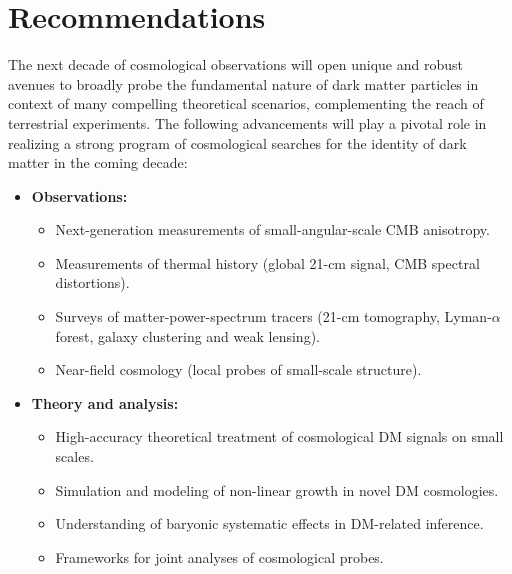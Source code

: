 \documentclass[12pt]{article}
\begin{document}
\section{Recommendations}
\label{sec:recommendations}
\vspace{-0.2cm}
The next decade of cosmological observations will open unique and robust avenues to broadly probe the fundamental nature of dark matter particles in context of many compelling theoretical scenarios, complementing the reach of terrestrial experiments.
The following advancements will play a pivotal role in realizing a strong program of cosmological searches for the identity of dark matter in the coming decade:
\vspace{-0.cm}
\begin{itemize}
    \item \textbf{Observations:}
    \begin{itemize}
        \item Next-generation measurements of small-angular-scale CMB anisotropy.
        \item Measurements of thermal history (global 21-cm signal, CMB spectral distortions).
        \item Surveys of matter-power-spectrum tracers (21-cm tomography, Lyman-$\alpha$ forest, galaxy clustering and weak lensing).
        \item Near-field cosmology (local probes of small-scale structure).
    \end{itemize}
    \vspace{-0.2cm}
    \item \textbf{Theory and analysis:}
    \begin{itemize}
        \item High-accuracy theoretical treatment of cosmological DM signals on small scales.
        \item Simulation and modeling of non-linear growth in novel DM cosmologies.
        \item Understanding of baryonic systematic effects in DM-related inference.
        \item Frameworks for joint analyses of cosmological probes.
        \end{itemize}
\end{itemize}


\end{document}
